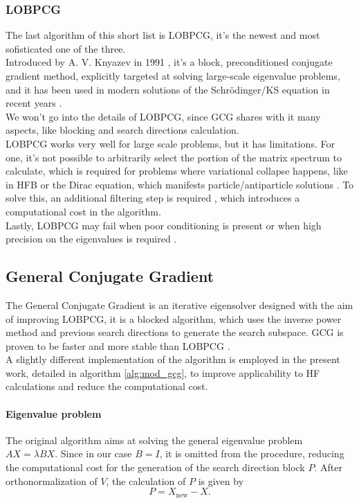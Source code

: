 \subsubsection{LOBPCG}
The last algorithm of this short list is LOBPCG, it's the newest and most sofisticated one of the three.
\\Introduced by A. V. Knyazev in 1991 \cite{LOBPCG}, it's a block, preconditioned conjugate gradient method, explicitly targeted at solving large-scale eigenvalue problems, and it has been used in modern solutions of the Schr\"odinger/KS equation in recent years \cite{LOBPCGDKS,Nottoli2023,LIN2013205,li2020efficient}.
\\We won't go into the details of LOBPCG, since GCG shares with it many aspects, like blocking and search directions calculation.
\\LOBPCG works very well for large scale problems, but it has limitations. 
For one, it's not possible to arbitrarily select the portion of the matrix spectrum to calculate, which is required for problems where variational collapse happens, like in HFB or the Dirac equation, which manifests particle/antiparticle solutions \cite{li2020efficient}.
To solve this, an additional filtering step is required \cite{LIN2013205,li2020efficient}, which introduces a computational cost in the algorithm.
\\Lastly, LOBPCG may fail when poor conditioning is present or when high precision on the eigenvalues is required \cite{GCG1}.
\subsection{General Conjugate Gradient}
\label{sec:gcg}
The General Conjugate Gradient is an iterative eigensolver designed with the aim of improving LOBPCG, it is a blocked algorithm, which uses the inverse power method and previous search directions to generate the search subspace. GCG is proven to be faster and more stable than LOBPCG \cite{GCG1}.
\\A slightly different implementation of the algorithm is employed in the present work, detailed in algorithm \ref{alg:mod_gcg}, to improve applicability to HF calculations and reduce the computational cost.
\paragraph{Eigenvalue problem} The original algorithm aims at solving the general eigenvalue problem $AX = \lambda BX$. Since in our case $B=I$, it is omitted from the procedure, reducing the computational cost for the generation of the search direction block $P$. After orthonormalization of $V$, the calculation of $P$ is given by
\begin{equation}
    \label{eq:gcg_p}
    P = X_\text{new} - X.
\end{equation}
